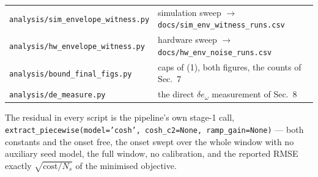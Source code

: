 \documentclass[10pt]{article}
\begin{document}
\begin{center}\small
\begin{tabular}{@{}ll@{}}
\toprule
\texttt{analysis/sim\_envelope\_witness.py} &
  simulation sweep $\to$ \texttt{docs/sim\_env\_witness\_runs.csv}\\
\texttt{analysis/hw\_envelope\_witness.py} &
  hardware sweep $\to$ \texttt{docs/hw\_env\_noise\_runs.csv}\\
\texttt{analysis/bound\_final\_figs.py} &
  caps of (1), both figures, the counts of Sec.~7\\
\texttt{analysis/de\_measure.py} &
  the direct $\delta e_\omega$ measurement of Sec.~8\\
\bottomrule
\end{tabular}
\end{center}

The residual in every script is the pipeline's own stage-1 call,
\texttt{extract\_piecewise(model='cosh', cosh\_c2=None,
ramp\_gain=None)} --- both constants and the onset free, the onset
swept over the whole window with no auxiliary seed model, the full
window, no calibration, and the reported RMSE exactly
$\sqrt{\mathrm{cost}/N_s}$ of the minimised objective.
\end{document}
